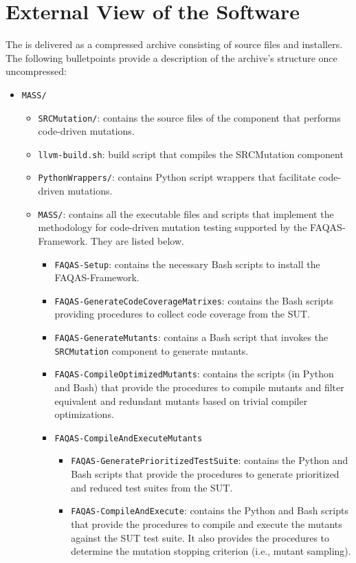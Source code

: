 
\chapter{External View of the Software}

The \FAQAS is delivered as a compressed archive consisting of source files and installers.
The following bulletpoints provide a description of the archive's structure once uncompressed:

\begin{itemize}
	\item \texttt{MASS/}
	\begin{itemize}
		\item \texttt{SRCMutation/}: contains the source files of the component that performs code-driven mutations.
		\item \texttt{llvm-build.sh}: build script that compiles the SRCMutation component
		\item \texttt{PythonWrappers/}: contains Python script wrappers that facilitate code-driven mutations.
		\item \texttt{MASS/}: contains all the executable files and scripts that implement the methodology for code-driven mutation testing supported by  the FAQAS-Framework. They are listed below.
		\begin{itemize}
			\item \texttt{FAQAS-Setup}: contains the necessary Bash scripts to install the FAQAS-Framework.
			\item \texttt{FAQAS-GenerateCodeCoverageMatrixes}: contains the Bash scripts providing procedures to collect code coverage from the SUT.
			\item \texttt{FAQAS-GenerateMutants}: contains a Bash script that invokes the \texttt{SRCMutation} component to generate mutants.
			\item \texttt{FAQAS-CompileOptimizedMutants}: contains the scripts (in Python and Bash)  that provide the procedures to compile mutants and filter equivalent and redundant mutants based on trivial compiler optimizations.
			\item \texttt{FAQAS-CompileAndExecuteMutants}
			\begin{itemize}
				\item \texttt{FAQAS-GeneratePrioritizedTestSuite}: contains the Python and Bash scripts that provide the procedures to generate prioritized and reduced test suites from the SUT.

				\item \texttt{FAQAS-CompileAndExecute}: contains the Python and Bash scripts that provide the procedures to compile and execute the mutants against the SUT test suite. It also provides the procedures to determine the mutation stopping criterion (i.e., mutant sampling).


\end{itemize}
\end{itemize}
\end{itemize}
\end{itemize}
